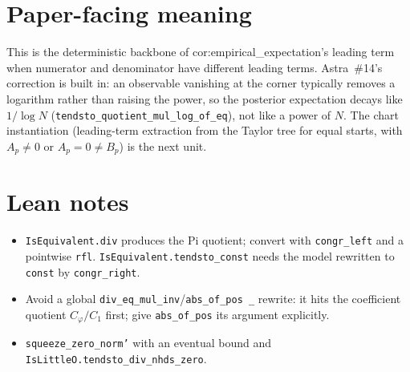 \documentclass[11pt]{article}
\begin{document}
\section{Paper-facing meaning}
This is the deterministic backbone of cor:empirical\_expectation's leading term when numerator and
denominator have different leading terms. Astra~\#14's correction is built in: an observable
vanishing at the corner typically removes a logarithm rather than raising the power, so the posterior
expectation decays like $1/\log N$ (\texttt{tendsto\_quotient\_mul\_log\_of\_eq}), not like a power of
$N$. The chart instantiation (leading-term extraction from the Taylor tree for equal starts, with
$A_p\neq0$ or $A_p=0\neq B_p$) is the next unit.

\section{Lean notes}
\begin{itemize}
\item \texttt{IsEquivalent.div} produces the Pi quotient; convert with \texttt{congr\_left} and a
pointwise \texttt{rfl}. \texttt{IsEquivalent.tendsto\_const} needs the model rewritten to
\texttt{const} by \texttt{congr\_right}.
\item Avoid a global \texttt{div\_eq\_mul\_inv}/\texttt{abs\_of\_pos \_} rewrite: it hits the
coefficient quotient $C_\varphi/C_1$ first; give \texttt{abs\_of\_pos} its argument explicitly.
\item \texttt{squeeze\_zero\_norm'} with an eventual bound and \texttt{IsLittleO.tendsto\_div\_nhds\_zero}.
\end{itemize}
\end{document}
